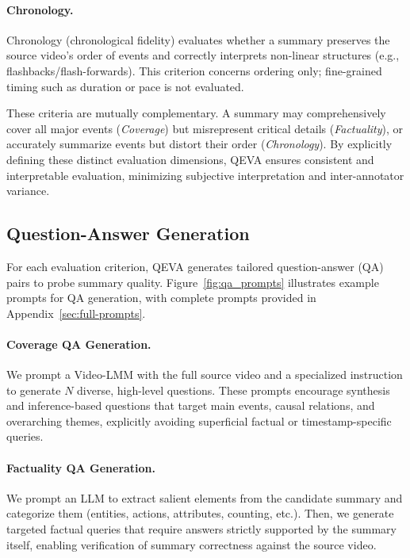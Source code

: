 \paragraph{Chronology.}
Chronology (chronological fidelity) evaluates whether a summary preserves the source video's order of events and correctly interprets non-linear structures (e.g., flashbacks/flash-forwards). 
This criterion concerns ordering only; fine-grained timing such as duration or pace is not evaluated.

These criteria are mutually complementary. A summary may comprehensively cover all major events (\textit{Coverage}) but misrepresent critical details (\textit{Factuality}), or accurately summarize events but distort their order (\textit{Chronology}). By explicitly defining these distinct evaluation dimensions, QEVA ensures consistent and interpretable evaluation, minimizing subjective interpretation and inter-annotator variance.

\subsection{Question-Answer Generation}
\label{sec:qa-generation}
For each evaluation criterion, QEVA generates tailored question-answer (QA) pairs to probe summary quality. Figure~\ref{fig:qa_prompts} illustrates example prompts for QA generation, with complete prompts provided in Appendix~\ref{sec:full-prompts}.

\paragraph{Coverage QA Generation.}
We prompt a Video-LMM with the full source video and a specialized instruction to generate $N$ diverse, high-level questions. These prompts encourage synthesis and inference-based questions that target main events, causal relations, and overarching themes, explicitly avoiding superficial factual or timestamp-specific queries.

\paragraph{Factuality QA Generation.}
We prompt an LLM to extract salient elements from the candidate summary and categorize them (entities, actions, attributes, counting, etc.). Then, we generate targeted factual queries that require answers strictly supported by the summary itself, enabling verification of summary correctness against the source video.

